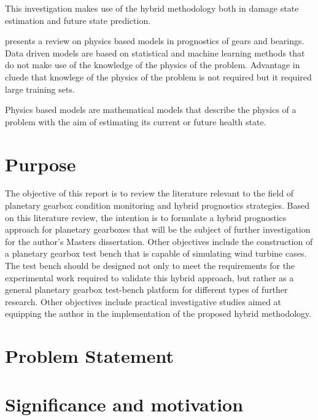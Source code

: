 This investigation makes use of the hybrid methodology both in damage state estimation and future state prediction.



\cite{Cubillo2016} presents a review on physics based models in prognostics of gears and bearings. 
Data driven models are based on statistical and machine learning methods that do not make use of the knowledge of the physics of the problem. Advantage in cluede that knowlege of the physics of the problem is not required but it required large training sets.

Physics based models are mathematical models that describe the physics of a problem with the aim of estimating its current or future health state.


\section{Purpose} %

The objective of this report is to review the literature relevant to the field of planetary gearbox condition monitoring and hybrid prognostics strategies. Based on this literature review, the intention is to formulate a hybrid prognostics approach for planetary gearboxes that will be the subject of further investigation for the author's Masters dissertation. Other objectives include the construction of a planetary gearbox test bench that is capable of simulating wind turbine cases. The test bench should be designed not only to meet the requirements for the experimental work required to validate this hybrid approach, but rather as a general planetary gearbox test-bench platform for different types of further research. Other objectives include practical investigative studies aimed at equipping the author in the implementation of the proposed hybrid methodology.


\section{Problem Statement}


\section{Significance and motivation}


